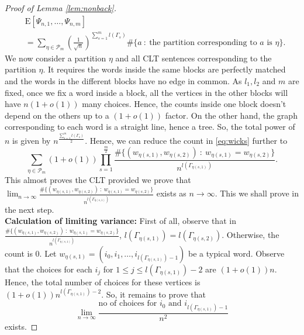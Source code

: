 \documentclass[reqno,12pt]{amsart}
\theoremstyle{plain}
\theoremstyle{definition}
\begin{document}
\begin{proof}[Proof of Lemma \ref{lem:nonback}]
\begin{equation}
    \begin{split}
        &\mathrm{E}\left[ \Psi_{n,1},\ldots, \Psi_{n,m} \right]\\
        &= \sum_{\eta \in \mathcal{P}_{m}} \left( \frac{1}{\sqrt{n}} \right)^{\sum_{s=1}^{m}l(\Gamma_{s})} \#\{a ~:~ \text{the partition corresponding to $a$ is $\eta$} \}.
    \end{split}
\end{equation}
We now consider a partition $\eta$ and all CLT sentences corresponding to the partition $\eta$.
It requires the words inside the same blocks are perfectly matched and the words in the different blocks have no edge in common. As $l_{1},l_{2}$ and $m$ are fixed, once we fix a word inside a block, all the vertices in the other blocks will have $n(1+o(1))$ many choices. Hence, the counts inside one block doesn't depend on the others up to a $(1+o(1))$ factor. On the other hand, the graph corresponding to each word is a straight line, hence a tree. So, the total power of $n$ is given by $n^{\frac{\sum_{s=1}^{m} l(\Gamma_{s})}{2}}$. Hence, we can reduce the count in \eqref{eq:wicks} further to 
\[
\sum_{\eta \in \mathcal{P}_{m}} (1+o(1)) \prod_{s=1}^{\frac{m}{2}} \frac{\#\{(w_{\eta(s,1)},w_{\eta(s,2)})~:~ w_{\eta(s,1)}= w_{\eta(s,2)}\}}{n^{l(\Gamma_{\eta(s,1)})}}.
\]
This almost proves the CLT provided we prove that $\lim_{n \to \infty} \frac{\#\{(w_{\eta(s,1)},w_{\eta(s,2)})~:~ w_{\eta(s,1)}= w_{\eta(s,2)}\}}{n^{l(\Gamma_{\eta(s,1)})}}$ exists as $n \to \infty$. This we shall prove in the next step.
\\
\textbf{Calculation of limiting variance:} 
First of all, observe that in $\frac{\#\{(w_{\eta(s,1)},w_{\eta(s,2)})~:~ w_{\eta(s,1)}= w_{\eta(s,2)}\}}{n^{l(\Gamma_{\eta(s,1)})}}$, $l(\Gamma_{\eta(s,1)})= l(\Gamma_{\eta(s,2)})$. Otherwise, the count is $0$. Let $w_{\eta(s,1)}= (i_{0},i_{1},\ldots, i_{l(\Gamma_{\eta(s,1)})-1})$ be a typical word. Observe that the choices for each $i_{j}$ for $1\le j \le l(\Gamma_{\eta(s,1)})-2$ are $(1+o(1))n$. Hence, the total number of choices for these vertices is $(1+o(1))n^{l(\Gamma_{\eta(s,1)})-2}$. So, it remains to prove that
\[
\lim_{n \to \infty} \frac{\text{no of choices for $i_{0}$ and $i_{l(\Gamma_{\eta(s,1)})-1}$}}{n^2}
\]
exists.


\end{proof}
\end{document}
